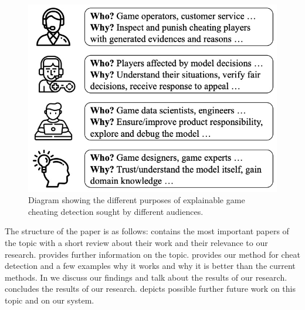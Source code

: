 \begin{figure}[h]
\centering
\includegraphics[width=0.4\linewidth]{images/purpose.jpeg}
\captionsetup{width=0.4\textwidth}
\caption{\label{fig:purpose}Diagram showing the different purposes of explainable game cheating detection sought by different audiences.}
\end{figure}

The structure of the paper is as follows:  contains the most important papers of the topic with a short review about their work and their relevance to our research.
 provides further information on the topic.
 provides our method for cheat detection and a few examples why it works and why it is better than the current methods.
In  we discuss our findings and talk about the results of our research.
 concludes the results of our research.
 depicts possible further future work on this topic and on our system.
